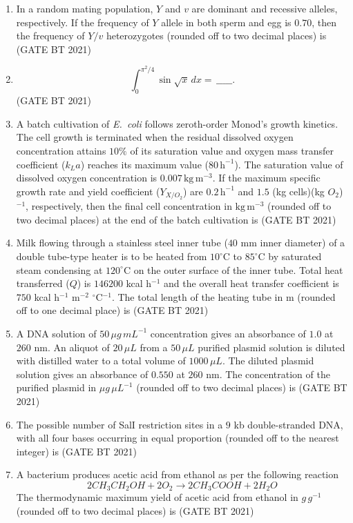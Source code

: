 \documentclass[journal,12pt,onecolumn]{IEEEtran}
\theoremstyle{remark}
\begin{document}
\begin{enumerate}
\item In a random mating population, $Y$ and $v$ are dominant and recessive alleles, respectively. If the frequency of $Y$ allele in both sperm and egg is $0.70$, then the frequency of $Y/v$ heterozygotes (rounded off to two decimal places) is
\hfill (GATE BT 2021)

\item 
\[
\int_{0}^{\pi^2/4} \sin \sqrt{x} \, dx = \, \_\_\_\_\_ .
\]
\hfill (GATE BT 2021)

\item A batch cultivation of \textit{E.\ coli} follows zeroth-order Monod's growth kinetics. The cell growth is terminated when the residual dissolved oxygen concentration attains $10\%$ of its saturation value and oxygen mass transfer coefficient ($k_L a$) reaches its maximum value ($80\,\text{h}^{-1}$). The saturation value of dissolved oxygen concentration is $0.007\,\text{kg}\,\text{m}^{-3}$. If the maximum specific growth rate and yield coefficient ($Y_{X/O_2}$) are $0.2\,\text{h}^{-1}$ and $1.5$ (kg cells)(kg $O_2$)$^{-1}$, respectively, then the final cell concentration in $\text{kg}\,\text{m}^{-3}$ (rounded off to two decimal places) at the end of the batch cultivation is
\hfill (GATE BT 2021)

\item Milk flowing through a stainless steel inner tube ($40$ mm inner diameter) of a double tube-type heater is to be heated from $10^\circ$C to $85^\circ$C by saturated steam condensing at $120^\circ$C on the outer surface of the inner tube. Total heat transferred ($Q$) is $146200$ kcal h$^{-1}$ and the overall heat transfer coefficient is $750$ kcal h$^{-1}$ m$^{-2}$ $^\circ$C$^{-1}$. The total length of the heating tube in m (rounded off to one decimal place) is
\hfill (GATE BT 2021)

\item A DNA solution of $50\,\mu g\,mL^{-1}$ concentration gives an absorbance of $1.0$ at $260$ nm. An aliquot of $20\,\mu L$ from a $50\,\mu L$ purified plasmid solution is diluted with distilled water to a total volume of $1000\,\mu L$. The diluted plasmid solution gives an absorbance of $0.550$ at $260$ nm. The concentration of the purified plasmid in $\mu g\,\mu L^{-1}$ (rounded off to two decimal places) is
\hfill (GATE BT 2021)

\item The possible number of SalI restriction sites in a $9$ kb double-stranded DNA, with all four bases occurring in equal proportion (rounded off to the nearest integer) is
\hfill (GATE BT 2021)

\item A bacterium produces acetic acid from ethanol as per the following reaction
\[
2CH_3CH_2OH + 2O_2 \rightarrow 2CH_3COOH + 2H_2O
\]
The thermodynamic maximum yield of acetic acid from ethanol in $g\,g^{-1}$ (rounded off to two decimal places) is
\hfill (GATE BT 2021)

\end{enumerate}
\end{document}
